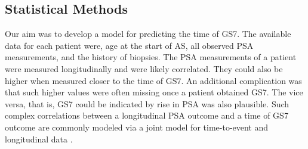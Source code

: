 \subsection{Statistical Methods}
Our aim was to develop a model for predicting the time of GS7. The available data for each patient were, age at the start of AS, all observed PSA measurements, and the history of biopsies. The PSA measurements of a patient were measured longitudinally and were likely correlated. They could also be higher when measured closer to the time of GS7. An additional complication was that such higher values were often missing once a patient obtained GS7. The vice versa, that is, GS7 could be indicated by rise in PSA was also plausible. Such complex correlations between a longitudinal PSA outcome and a time of GS7 outcome are commonly modeled via a joint model for time-to-event and longitudinal data \citep{rizopoulos2012joint,tomer2019,coley2017prediction}.

